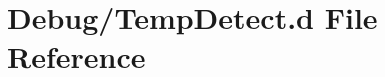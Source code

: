 \hypertarget{_temp_detect_8d}{}\section{Debug/\+Temp\+Detect.d File Reference}
\label{_temp_detect_8d}
